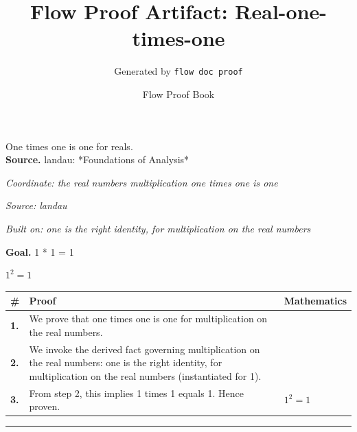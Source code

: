 \documentclass[11pt]{article}
\title{Flow Proof Artifact: Real-one-times-one}
\author{Generated by \texttt{flow doc proof}}
\date{Flow Proof Book}
\theoremstyle{definition}
\begin{document}
\maketitle
One times one is one for reals.\\[0.5em]
\textbf{Source.} landau: *Foundations of Analysis*\\[0.5em]
\bigskip
{}\par
\smallskip\noindent\textit{Coordinate: the real numbers \cdot multiplication \cdot one times one is one}\par
\smallskip\noindent\textit{Source: landau}\par
\smallskip\noindent\textit{Built on: one is the right identity, for multiplication on the real numbers}\par
\medskip
\noindent\textbf{Goal.} 1 * 1 = 1\par
\noindent$\displaystyle 1^{2} = 1$\par
\medskip
\noindent
\begin{tabular}{@{} >{\raggedright\arraybackslash}p{} >{\raggedright\arraybackslash}p{} >{\raggedleft\arraybackslash}p{} @{}}
\textbf{\#} & \textbf{Proof} & \textbf{Mathematics} \\
\midrule
\textbf{1.} & We prove that one times one is one for multiplication on the real numbers. & \\[0.45em]
\textbf{2.} & We invoke the derived fact governing multiplication on the real numbers: one is the right identity, for multiplication on the real numbers (instantiated for 1). & \\[0.45em]
\textbf{3.} & From step 2, this implies 1 times 1 equals 1. Hence proven. & $\displaystyle 1^{2} = 1$ \\[0.45em]
\bottomrule
\end{tabular}
\label{thm:Real-multiplication-one_times_one_is_one}
\par\medskip\hrule
\end{document}
